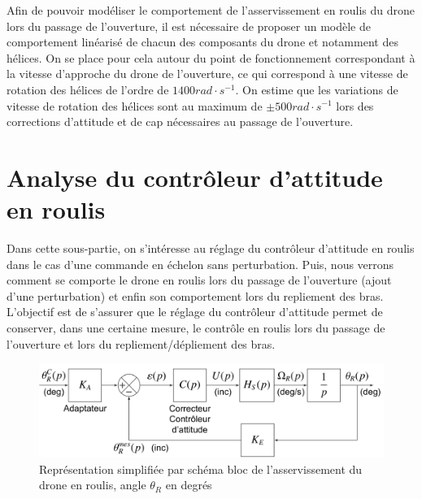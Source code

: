 Afin de pouvoir modéliser le comportement de l'asservissement en roulis du drone lors du passage de l'ouverture, il est nécessaire de proposer un modèle de comportement linéarisé de chacun des composants du drone et notamment des hélices. On se place pour cela autour du point de fonctionnement correspondant à la vitesse d'approche du drone de l'ouverture, ce qui correspond à une vitesse de rotation des hélices de l'ordre de $1400rad\cdot s^{-1}$. On estime
que les variations de vitesse de rotation des hélices sont au maximum de $\pm 500rad\cdot s^{-1}$ lors des corrections d'attitude et de cap nécessaires au passage de l'ouverture.


\section{Analyse du contrôleur d'attitude en roulis}

Dans cette sous-partie, on s'intéresse au réglage du contrôleur d'attitude en roulis dans le cas d'une commande en échelon sans perturbation. Puis, nous verrons comment se comporte le drone en roulis lors du passage de l'ouverture (ajout d'une perturbation) et enfin son comportement lors du repliement des bras. L'objectif est de s'assurer que le réglage du contrôleur d'attitude permet de conserver, dans une certaine mesure, le contrôle en roulis lors du passage de l'ouverture et lors du repliement/dépliement des bras.

\begin{figure}[ht!]
\begin{center}
 \includegraphics[width=0.85\linewidth]{img/fig18}
\end{center}
\caption{\label{fig18} Représentation simplifiée par schéma bloc de l'asservissement du drone en roulis, angle $\theta_R$ en degrés}
\end{figure}

